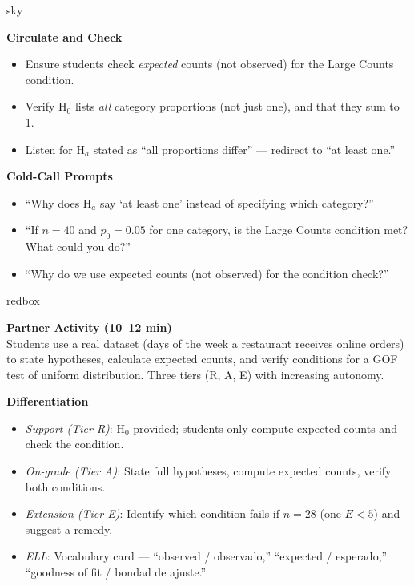 \documentclass[10pt]{article}
\begin{document}
\begin{skillbox}{sky}
\begin{minipage}[t]{0.48\linewidth}
    \textbf{Circulate and Check}
    \begin{itemize}
        \item Ensure students check \emph{expected} counts (not observed) for the
              Large Counts condition.
        \item Verify H$_0$ lists \emph{all} category proportions (not just one), and
              that they sum to 1.
        \item Listen for H$_a$ stated as ``all proportions differ'' --- redirect to
              ``at least one.''
    \end{itemize}
\end{minipage}
\hfill
\begin{minipage}[t]{0.48\linewidth}
    \textbf{Cold-Call Prompts}
    \begin{itemize}
        \item ``Why does H$_a$ say `at least one' instead of specifying which category?''
        \item ``If $n = 40$ and $p_0 = 0.05$ for one category, is the Large Counts
              condition met? What could you do?''
        \item ``Why do we use expected counts (not observed) for the condition check?''
    \end{itemize}
\end{minipage}
\end{skillbox}

\begin{skillbox}{redbox}
\begin{minipage}[t]{0.48\linewidth}
    \textbf{Partner Activity (10--12 min)}\\
    Students use a real dataset (days of the week a restaurant receives online orders)
    to state hypotheses, calculate expected counts, and verify conditions for a GOF test
    of uniform distribution. Three tiers (R, A, E) with increasing autonomy.
\end{minipage}
\hfill
\begin{minipage}[t]{0.48\linewidth}
    \textbf{Differentiation}
    \begin{itemize}
        \item \textit{Support (Tier R)}: H$_0$ provided; students only compute expected
              counts and check the condition.
        \item \textit{On-grade (Tier A)}: State full hypotheses, compute expected counts,
              verify both conditions.
        \item \textit{Extension (Tier E)}: Identify which condition fails if $n = 28$
              (one $E < 5$) and suggest a remedy.
        \item \textit{ELL}: Vocabulary card --- ``observed / observado,''
              ``expected / esperado,'' ``goodness of fit / bondad de ajuste.''
    \end{itemize}
\end{minipage}
\end{skillbox}
\end{document}
